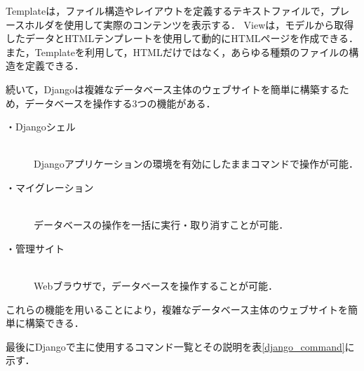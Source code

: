 Templateは，ファイル構造やレイアウトを定義するテキストファイルで，プレースホルダを使用して実際のコンテンツを表示する．
Viewは，モデルから取得したデータとHTMLテンプレートを使用して動的にHTMLページを作成できる．
また，Templateを利用して，HTMLだけではなく，あらゆる種類のファイルの構造を定義できる．

\newpage
続いて，Djangoは複雑なデータベース主体のウェブサイトを簡単に構築するため，データベースを操作する3つの機能がある．
\begin{description}
    \item[・Djangoシェル]\mbox{}\\
        Djangoアプリケーションの環境を有効にしたままコマンドで操作が可能．
    \item[・マイグレーション]\mbox{}\\
        データベースの操作を一括に実行・取り消すことが可能．
    \item[・管理サイト]\mbox{}\\
        Webブラウザで，データベースを操作することが可能． 
\end{description}
これらの機能を用いることにより，複雑なデータベース主体のウェブサイトを簡単に構築できる．

最後にDjangoで主に使用するコマンド一覧とその説明を表\ref{django_command}に示す．

